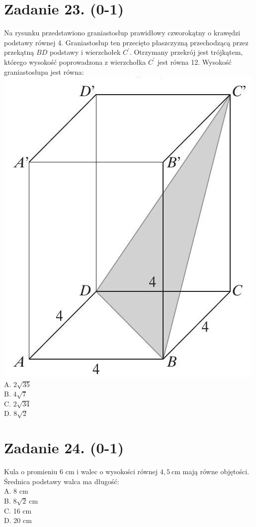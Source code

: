 \documentclass[10pt]{article}
\begin{document}
\section*{Zadanie 23. (0-1)}
Na rysunku przedstawiono graniastosłup prawidłowy czworokątny o krawędzi podstawy równej 4. Graniastosłup ten przecięto płaszczyzną przechodzącą przez przekątną \(B D\) podstawy i wierzchołek \(C^{\prime}\). Otrzymany przekrój jest trójkątem, którego wysokość poprowadzona z wierzchołka \(C^{\prime}\) jest równa 12. Wysokość graniastosłupa jest równa:\\
\includegraphics[max width=\textwidth, center]{2024_11_21_724abc2cf5a71562f5b2g-08}\\
A. \(2 \sqrt{35}\)\\
B. \(4 \sqrt{7}\)\\
C. \(2 \sqrt{34}\)\\
D. \(8 \sqrt{2}\)

\section*{Zadanie 24. (0-1)}
Kula o promieniu 6 cm i walec o wysokości równej \(4,5 \mathrm{~cm}\) mają równe objętości. Średnica podstawy walca ma długość:\\
A. 8 cm\\
B. \(8 \sqrt{2} \mathrm{~cm}\)\\
C. 16 cm\\
D. 20 cm
\end{document}
